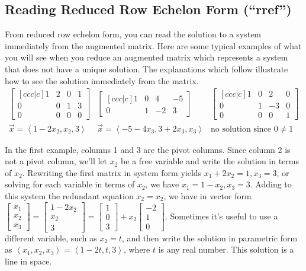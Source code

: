 {\subsection{Reading Reduced Row Echelon Form (``rref'')}

From reduced row echelon form, you can read the solution to a system immediately from the augmented matrix.  Here are some typical examples of what you will see when you reduce an augmented matrix which represents a system that does not have a unique solution. The explanations which follow illustrate how to see the solution immediately from the matrix.
$$\begin{array}{ccc}
 \begin{bmatrix}[ccc|c] 1&2&0&1\\0&0&1&3
\\0&0&0&0\end{bmatrix} 
& \begin{bmatrix}[ccc|c] 1&0&4&-5\\0&1&-2&3
\end{bmatrix} 
& \begin{bmatrix}[ccc|c] 1&0&2&0\\0&1&-3&0
\\0&0&0&1\end{bmatrix} 
\\
\vec x = \left<1-2x_2,x_2,3\right>
&\vec x = \left<-5-4x_3,3+2x_3,x_3\right>
&\text{no solution since } 0\neq1
\end{array}
$$

\begin{example}
In the first example, columns 1 and 3 are the pivot columns. Since column 2 is not a pivot column, we'll let $x_2$ be a free variable and write the solution in terms of $x_2$. Rewriting the first matrix in system form yields $x_1+2x_2 =1,x_3=3$, or solving for each variable in terms of $x_2$, we have $x_1=1-x_2,x_3=3$.  
Adding to this system the redundant equation $x_2=x_2$, we have in vector form 
$\begin{bmatrix}x_1\\x_2\\x_3\end{bmatrix} = \begin{bmatrix}1-2x_2\\x_2\\3\end{bmatrix} = \begin{bmatrix}1\\0\\3\end{bmatrix} + x_2 \begin{bmatrix}-2\\1\\0\end{bmatrix}$. 
Sometimes it's useful to use a different variable, such as $x_2=t$, and then write the solution in parametric form as $\left<x_1,x_2,x_3\right>=\left<1-2t,t,3\right>$, where $t$ is any real number. This solution is a line in space. 
\end{example}

}
